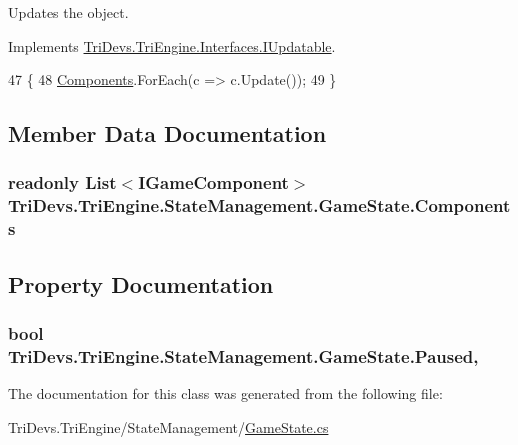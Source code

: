 Updates the object. 



Implements \hyperlink{interface_tri_devs_1_1_tri_engine_1_1_interfaces_1_1_i_updatable_a5392174d0eb92b04a0ef1908ce725f29}{Tri\-Devs.\-Tri\-Engine.\-Interfaces.\-I\-Updatable}.


\begin{DoxyCode}
47         \{
48             \hyperlink{class_tri_devs_1_1_tri_engine_1_1_state_management_1_1_game_state_a0e38f881a0d0082c2e92f1441c08abb6}{Components}.ForEach(c => c.Update());
49         \}
\end{DoxyCode}


\subsection{Member Data Documentation}
\hypertarget{class_tri_devs_1_1_tri_engine_1_1_state_management_1_1_game_state_a0e38f881a0d0082c2e92f1441c08abb6}{
\subsubsection[{Components}]{\setlength{\rightskip}{0pt plus 5cm}readonly List$<${\bf I\-Game\-Component}$>$ Tri\-Devs.\-Tri\-Engine.\-State\-Management.\-Game\-State.\-Components\hspace{0.3cm}{\ttfamily [protected]}}}\label{class_tri_devs_1_1_tri_engine_1_1_state_management_1_1_game_state_a0e38f881a0d0082c2e92f1441c08abb6}


\subsection{Property Documentation}
\hypertarget{class_tri_devs_1_1_tri_engine_1_1_state_management_1_1_game_state_ac2f5eefd53854742bbe988c7679a8a69}{
\subsubsection[{Paused}]{\setlength{\rightskip}{0pt plus 5cm}bool Tri\-Devs.\-Tri\-Engine.\-State\-Management.\-Game\-State.\-Paused\hspace{0.3cm}{\ttfamily [get]}, {\ttfamily [set]}}}\label{class_tri_devs_1_1_tri_engine_1_1_state_management_1_1_game_state_ac2f5eefd53854742bbe988c7679a8a69}


The documentation for this class was generated from the following file\-:\begin{DoxyCompactItemize}
\item 
Tri\-Devs.\-Tri\-Engine/\-State\-Management/\hyperlink{_game_state_8cs}{Game\-State.\-cs}\end{DoxyCompactItemize}
